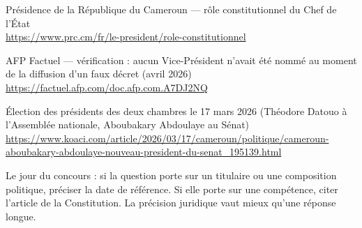 \documentclass[11pt,a4paper,oneside]{report}
\begin{document}
\begin{description}[style=nextline,leftmargin=1.3cm,labelwidth=1cm]
  \item[S8] Présidence de la République du Cameroun — rôle constitutionnel du Chef de l'État \\ \url{https://www.prc.cm/fr/le-president/role-constitutionnel}
  \item[S9] AFP Factuel — vérification : aucun Vice-Président n'avait été nommé au moment de la diffusion d'un faux décret (avril 2026) \\ \url{https://factuel.afp.com/doc.afp.com.A7DJ2NQ}
  \item[S10] Élection des présidents des deux chambres le 17 mars 2026 (Théodore Datouo à l'Assemblée nationale, Aboubakary Abdoulaye au Sénat) \\ \url{https://www.koaci.com/article/2026/03/17/cameroun/politique/cameroun-aboubakary-abdoulaye-nouveau-president-du-senat_195139.html}
\end{description}
\begin{keybox}[title={À retenir — dernier conseil}]
Le jour du concours : si la question porte sur un titulaire ou une composition politique, préciser la date de référence. Si elle porte sur une compétence, citer l'article de la Constitution. La précision juridique vaut mieux qu'une réponse longue.
\end{keybox}
\end{document}
